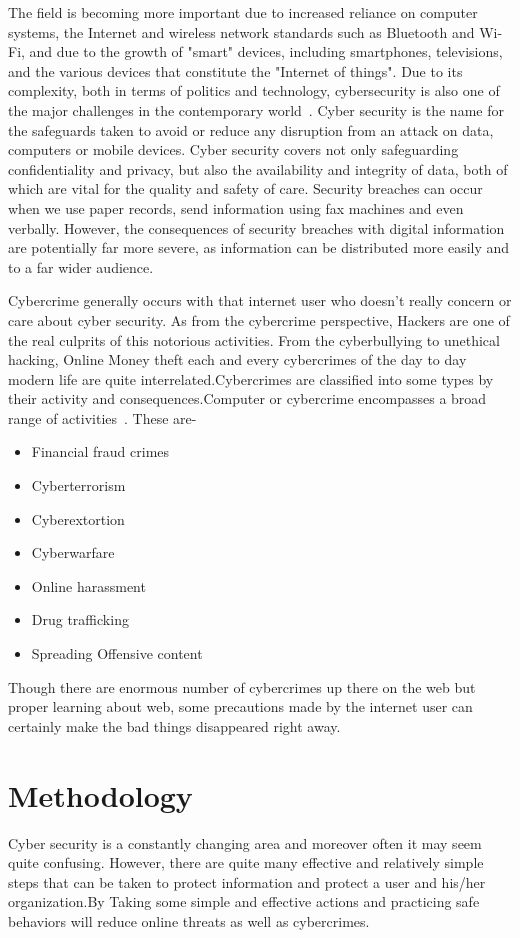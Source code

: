 \documentclass[conference,column]{IEEEtran}
\begin{document}
		
		The field is becoming more important due to increased reliance on computer systems, the Internet and wireless network standards such as Bluetooth and Wi-Fi, and due to the growth of "smart" devices, including smartphones, televisions, and the various devices that constitute the "Internet of things". Due to its complexity, both in terms of politics and technology, cybersecurity is also one of the major challenges in the contemporary world~\cite{type}. Cyber security is the name for the safeguards taken to avoid or reduce any disruption from an attack on data, computers or mobile devices. Cyber security covers not only safeguarding confidentiality and privacy, but also the availability and integrity of data, both of which are vital for the quality and safety of care. Security breaches can occur when we use paper records, send information using fax machines and even verbally. However, the consequences of security breaches with digital information are potentially far more severe, as information can be distributed more easily and to a far wider audience.
		
		
		Cybercrime generally occurs with that internet user who doesn't really concern or care about cyber security. As from the cybercrime perspective, Hackers are one of the real culprits of this notorious activities. From the cyberbullying to unethical hacking, Online Money theft each and every cybercrimes of the day to day modern life are quite interrelated.Cybercrimes are classified into some types by their activity and consequences.Computer or cybercrime encompasses a broad range of activities~\cite{typee}. These are- 
		\begin{itemize}
			\item Financial fraud crimes
			\item Cyberterrorism
			\item Cyberextortion
			\item Cyberwarfare
			\item Online harassment
			\item Drug trafficking
			\item Spreading Offensive content
		\end{itemize}
	
	
		Though there are enormous number of cybercrimes up there on the web but proper learning about web, some precautions made by the internet user can certainly make the bad things disappeared right away.  
		
	\section{Methodology}
		Cyber security is a constantly changing area and moreover often it may seem quite confusing. However, there are quite many effective and relatively simple steps that can be taken to protect information and protect a user and his/her organization.By Taking some simple and effective actions and practicing safe behaviors will reduce online threats as well as cybercrimes.\\\\
		
\end{document}
